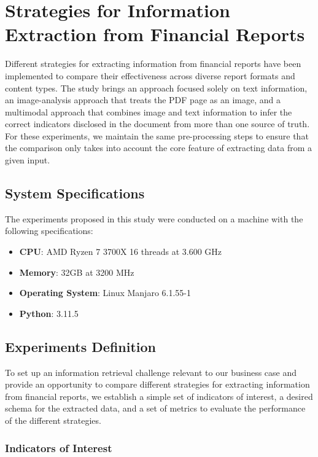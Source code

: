 \documentclass[english, 12pt, a4paper, elec, utf8, a-2b, online]{aaltothesis}
\begin{document}
\clearpage

\section{Strategies for Information Extraction from Financial Reports}

Different strategies for extracting information from financial reports have been implemented to compare their effectiveness across diverse report formats and content types.
The study brings an approach focused solely on text information, an image-analysis approach that treats the \ac{PDF} page as an image, and a multimodal approach that combines image and text information to infer the correct indicators disclosed in the document from more than one source of truth.
For these experiments, we maintain the same pre-processing steps to ensure that the comparison only takes into account the core feature of extracting data from a given input.

\subsection{System Specifications}

The experiments proposed in this study were conducted on a machine with the following specifications:

\begin{itemize}
    \item \textbf{CPU}: AMD Ryzen 7 3700X 16 threads at 3.600 GHz
    \item \textbf{Memory}: 32GB at 3200 MHz
    \item \textbf{Operating System}: Linux Manjaro 6.1.55-1
    \item \textbf{Python}: 3.11.5
\end{itemize}

\subsection{Experiments Definition}

To set up an information retrieval challenge relevant to our business case and provide an opportunity to compare different strategies for extracting information from financial reports, we establish a simple set of indicators of interest, a desired schema for the extracted data, and a set of metrics to evaluate the performance of the different strategies.

\subsubsection{Indicators of Interest}
\end{document}
